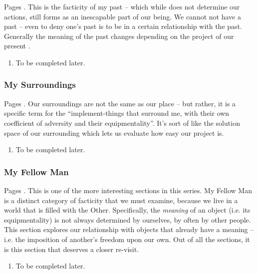 Pages \autocite[646 -- 657]{sartre}. This is the facticity of my past -- which while does not determine our actions, still forms as an inescapable part of our being. We cannot not have a past -- even to deny one's past is to be in a certain relationship with the past. Generally the meaning of the past changes depending on the project of our present \autocite[649]{sartre}.

\begin{enumerate}
  \item To be completed later.
\end{enumerate}

\subsubsection{My Surroundings}

Pages \autocite[657 -- 663]{sartre}. Our surroundings are not the same as our place -- but rather, it is a specific term for the \enquote{implement-things that surround me, with their own coefficient of adversity and their equipmentality}. It's sort of like the solution space of our surrounding which lets us evaluate how easy our project is.

\begin{enumerate}
  \item To be completed later.
\end{enumerate}

\subsubsection{My Fellow Man}

Pages \autocite[663 -- 689]{sartre}.  This is one of the more interesting sections in this series. My Fellow Man is a distinct category of facticity that we must examine, because we live in a world that is filled with the Other. Specifically, the \emph{meaning} of an object (i.e. its equipmentality) is not always determined by ourselves, by often by other people. This section explores our relationship with objects that already have a meaning -- i.e. the imposition of another's freedom upon our own. Out of all the sections, it is this section that deserves a closer re-visit.

\begin{enumerate}
  \item To be completed later.
\end{enumerate}

